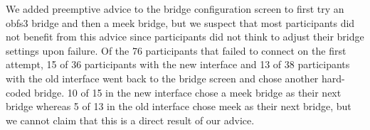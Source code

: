 \documentclass[USenglish,oneside,twocolumn]{article}
\begin{document}
%
%

We added preemptive advice to the bridge configuration screen to first try an obfs3 bridge and then a meek bridge, but we suspect that most participants did not benefit from this advice since participants did not think to adjust their bridge settings upon failure. Of the 76 participants that failed to connect on the first attempt, 15 of 36 participants with the new interface and 13 of 38 participants with the old interface went back to the bridge screen and chose another hard-coded bridge. 10 of 15 in the new interface chose a meek bridge as their next bridge whereas 5 of 13 in the old interface chose meek as their next bridge, but we cannot claim that this is a direct result of our advice.
\end{document}
